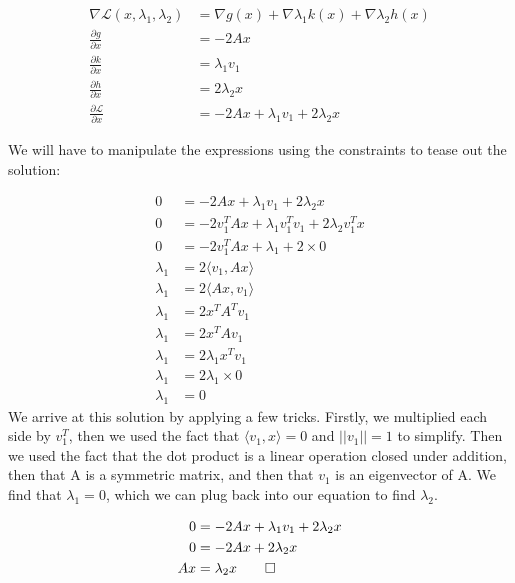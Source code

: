 \documentclass[12pt,twoside]{article}
\newcommand{\Lagr}{\mathcal{L}}
\begin{document}
\begin{equation}
    \begin{split}
    \nabla \Lagr (x, \lambda_1, \lambda_2) &= \nabla g(x) + \nabla \lambda_1 k(x)  + \nabla \lambda_2 h(x) \\
    \frac{\partial g}{\partial x} &= -2Ax \\
        \frac{\partial k}{\partial x} &= \lambda_1 v_1 \\
    \frac{\partial h}{\partial x} &= 2\lambda_2 x \\
    \frac{\partial \Lagr}{\partial x} &= -2Ax + \lambda_1 v_1 + 2\lambda _2x 
    \end{split}
\end{equation}

 We will have to manipulate the expressions using the constraints to tease out the solution:
 
\begin{equation}
    \begin{split}
        0 &= -2Ax + \lambda_1 v_1 + 2\lambda_2 x  \\
        0 &= -2v_1^TAx + \lambda_1 v_1^Tv_1 + 2\lambda_2 v_1^Tx \\
        0 &= -2v_1^TAx + \lambda_1 + 2 \times 0 \\
        \lambda_1 &= 2 \langle v_1, Ax \rangle \\
        \lambda_1 &= 2 \langle Ax, v_1 \rangle \\
        \lambda_1 &= 2 x^TA^Tv_1 \\ 
        \lambda_1 &= 2x^TAv_1\\
        \lambda_1  &= 2\lambda_1 x^Tv_1 \\  
        \lambda_1  &= 2\lambda_1 \times 0 \\
        \lambda_1 &= 0
    \end{split}
\end{equation}
We arrive at this solution by applying a few tricks. Firstly, we multiplied each side by $v_1^T$, then we used the fact that $\langle v_1, x \rangle = 0$ and $||v_1|| = 1$ to simplify. Then we used the fact that the dot product is a linear operation closed under addition, then that A is a symmetric matrix, and then that $v_1$ is an eigenvector of A. We find that $\lambda_1=0$, which we can plug back into our equation to find $\lambda_2$.

\begin{equation}
    \begin{split}
        0 &= -2Ax + \lambda_1 v_1 + 2\lambda_2 x  \\
        0 &= -2Ax + 2\lambda_2x \\
        Ax &= \lambda_2 x \qed
    \end{split}
\end{equation}
\end{document}
